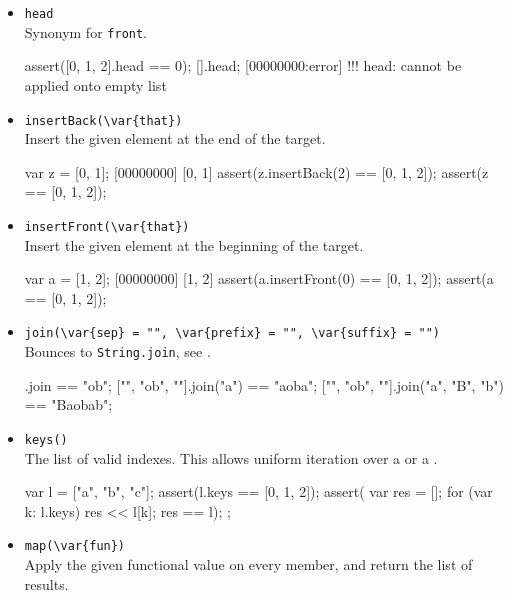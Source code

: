 \begin{itemize}
\item \lstinline|head|\\
  Synonym for \lstinline|front|.
\begin{urbiscript}
assert([0, 1, 2].head == 0);
[].head;
[00000000:error] !!! head: cannot be applied onto empty list
\end{urbiscript}

\item \lstinline|insertBack(\var{that})|\\
  Insert the given element at the end of the target.

\begin{urbiscript}
var z = [0, 1];
[00000000] [0, 1]
assert(z.insertBack(2) == [0, 1, 2]);
assert(z == [0, 1, 2]);
\end{urbiscript}

\item \lstinline|insertFront(\var{that})|\\
  Insert the given element at the beginning of the target.

\begin{urbiscript}
var a = [1, 2];
[00000000] [1, 2]
assert(a.insertFront(0) == [0, 1, 2]);
assert(a == [0, 1, 2]);
\end{urbiscript}

\item \lstinline|join(\var{sep} = "", \var{prefix} = "", \var{suffix} = "")|\\
  Bounces to \lstinline|String.join|, see .

\begin{urbiassert}
["", "ob", ""].join                == "ob";
["", "ob", ""].join("a")           == "aoba";
["", "ob", ""].join("a", "B", "b") == "Baobab";
\end{urbiassert}

\item \lstinline|keys()|\\
  The list of valid indexes.  This allows uniform iteration over a
   or a .

\begin{urbiscript}
{
  var l = ["a", "b", "c"];
  assert(l.keys == [0, 1, 2]);
  assert({
           var res = [];
           for (var k: l.keys)
             res << l[k];
           res
         }
         == l);
};
\end{urbiscript}

\item \lstinline|map(\var{fun})|\\
Apply the given functional value on every member, and return the list
of results.


\end{itemize}
